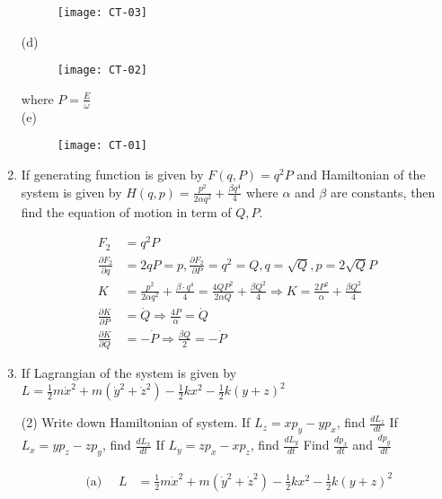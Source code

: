 \begin{enumerate}
\begin{answer}
	\begin{figure}[H]
		\centering
		\texttt{[image: CT-03]}
	\end{figure}
(d)	\begin{figure}[H]
	\centering
	\texttt{[image: CT-02]}
\end{figure}
where $P=\frac{E}{\omega}$\\
(e)
	\begin{figure}[H]
	\centering
	\texttt{[image: CT-01]}
\end{figure}
\end{answer}
	\item If generating function is given by $F(q, P)=q^{2} P$ and Hamiltonian of the system is given by $H(q, p)=\frac{p^{2}}{2 \alpha q^{2}}+\frac{\beta q^{4}}{4}$ where $\alpha$ and $\beta$ are constants, then find the equation of motion in term of $Q, P$.
	\begin{answer}
		\begin{align*}
		F_{2}&=q^{2} P\\
		\frac{\partial F_{2}}{\partial q}&=2 q P=p, \frac{\partial F_{2}}{\partial P}=q^{2}=Q, q=\sqrt{Q}, p=2 \sqrt{Q} P\\
		K&=\frac{p^{2}}{2 \alpha q^{2}}+\frac{\beta \cdot q^{4}}{4}=\frac{4 Q P^{2}}{2 \alpha Q}+\frac{\beta Q^{2}}{4} \Rightarrow K=\frac{2 P^{2}}{\alpha}+\frac{\beta Q^{2}}{4}\\
	\frac{\partial K}{\partial P}&=\dot{Q} \Rightarrow \frac{4 P}{\alpha}=\dot{Q} \\
		\frac{\partial K}{\partial Q}&=-\dot{P} \Rightarrow \frac{\beta Q}{2}=-\dot{P}
		\end{align*}
	\end{answer}
	\item If Lagrangian of the system is given by $L=\frac{1}{2} m \dot{x}^{2}+m\left(\dot{y}^{2}+\dot{z}^{2}\right)-\frac{1}{2} k x^{2}-\frac{1}{2} k(y+z)^{2}$
	 \begin{tasks}(2)
		\task[\textbf{a.}]Write down Hamiltonian of system.
		\task[\textbf{b.}]If $L_{z}=x p_{y}-y p_{x}$, find $\frac{d L_{z}}{d t}$
		\task[\textbf{c.}]If $L_{x}=y p_{z}-z p_{y}$, find $\frac{d L_{x}}{d t}$
		\task[\textbf{d.}] If $L_{y}=z p_{x}-x p_{z}$, find $\frac{d L_{y}}{d t}$
		\task[\textbf{e.}] Find $\frac{d p_{x}}{d t}$ and $\frac{d p_{y}}{d t}$
	\end{tasks}
\begin{answer}
	\begin{align*}
	\text { (a) } \quad L&=\frac{1}{2} m \dot{x}^{2}+m\left(\dot{y}^{2}+\dot{z}^{2}\right)-\frac{1}{2} k x^{2}-\frac{1}{2} k(y+z)^{2}\\

\end{align*}
\end{answer}
\end{enumerate}
